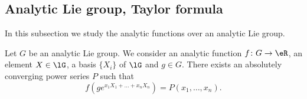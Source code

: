 \subsection{Analytic Lie group, Taylor formula}

In this subsection we study the analytic functions over an analytic Lie group.

\begin{lemma}     \label{LEMooPILVooHQbtAH}
	Let \( G\) be an analytic Lie group. We consider an analytic function \( f\colon G\to \eR\), an element \( X\in \lG\), a basis \( \{ X_i \}\) of \( \lG\) and \( g\in G\). There exists an absolutely converging power series \( P\) such that
	\begin{equation}
		f(g e^{x_1X_1+\ldots +x_nX_n})=P(x_1,\ldots, x_n).
	\end{equation}
\end{lemma}

